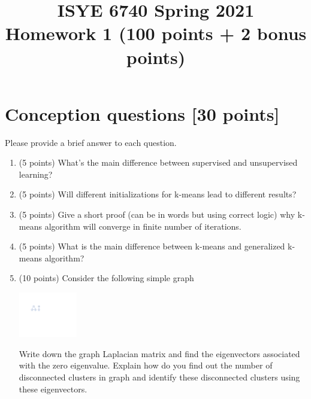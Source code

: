\documentclass[twoside,10pt]{article}
\begin{document}
\title{ISYE 6740 Spring 2021\\ Homework 1 (100 points + 2 bonus points)}
\date{}

\maketitle

\vspace{-.5in}


\section{Conception questions [30 points]}

Please provide a brief answer to each question.

\begin{enumerate}

\item (5 points) What's the main difference between supervised and unsupervised learning?

\item (5 points) Will different initializations for k-means lead to different results?

\item (5 points) Give a short proof (can be in words but using correct logic) why k-means algorithm will converge in finite number of iterations.

\item (5 points) What is the main difference between k-means and generalized k-means algorithm?



\item (10 points) Consider the following simple graph
\begin{center}
\includegraphics[width = 0.2\textwidth]{plot}
\end{center}

Write down the graph Laplacian matrix and find the eigenvectors associated with the zero eigenvalue. Explain how do you find out the number of disconnected clusters in graph and identify these disconnected clusters using these eigenvectors.



\end{enumerate}
\end{document}
